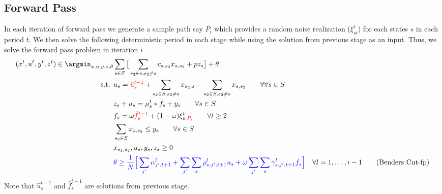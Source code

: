 \documentclass[11pt,letterpaper]{article}
\begin{document}
\subsection*{Forward Pass}
In each iteration of forward pass we generate a sample path say $P_i$ which provides a random noise realization ($\xi^t_{si}$) for each states $s$ in each period $t$. We then solve the following deterministic period in each stage while using the solution from previous stage as an input.
Thus, we solve the forward pass problem in iteration $i$
\begin{align}
    (x^t,u^t,y^t,z^t) \in \argmin_{x,u,y,z,\theta} & \sum_{s\in S}\big[\sum_{s_2 \in s, s_2\neq s} c_{s,s_2}x_{s,s_2}+pz_{s}\big]+\theta\\
    \text{s.t. } & u_s=\textcolor{red}{{\hat{u}}_s^{t-1}}+\sum_{s_2\in S,s_2\neq s}x_{s_2,s}-\sum_{s_2\in S, s_2\neq s}x_{s,s_2} \qquad \forall \forall s \in S\\
    & z_s+u_s=\mu^{t}_{s}*f_s+y_s \qquad \forall s \in S\\
    &f_s=\omega \textcolor{red}{\hat{f}^{t-1}_s}+(1-\omega)\xi^t_{s,\textcolor{red}{P_i}} \qquad \forall t\ge 2\\
    & \sum_{s_2\in S}x_{s,s_2}\le y_{s} \qquad \forall s \in S\\
    & x_{s_1,s_2}, u_s,y_s,z_s\ge 0 \\
    & \textcolor{blue}{\theta\ge \frac1N \Big[\sum_{j'}\alpha^l_{j',t+1}+\sum_{j'}\sum_s\rho^l_{s,j',t+1}{u}_s +\omega\sum_{j'}\sum_s\gamma^l_{s,j',t+1}{f}_s \Big]} \quad \forall l=1,\dots,i-1 \tag{Benders Cut-fp}
\end{align}
Note that ${\hat{u}}_s^{t-1}$ and ${\hat{f}}_s^{t-1}$ are solutions from previous stage. 
\end{document}
